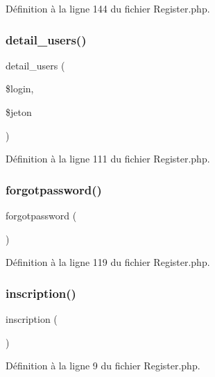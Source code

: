Définition à la ligne 144 du fichier Register.\+php.

\mbox{\label{class_register_a312b3f7f729d750399310ae8c7b8c7de}} 
\subsubsection{\texorpdfstring{detail\+\_\+users()}{detail\_users()}}
{\footnotesize\ttfamily detail\+\_\+users (\begin{DoxyParamCaption}\item[{}]{\$login,  }\item[{}]{\$jeton }\end{DoxyParamCaption})}



Définition à la ligne 111 du fichier Register.\+php.

\mbox{\label{class_register_a29c35afa0b38a581afe73649e5ab755f}} 
\subsubsection{\texorpdfstring{forgotpassword()}{forgotpassword()}}
{\footnotesize\ttfamily forgotpassword (\begin{DoxyParamCaption}{ }\end{DoxyParamCaption})}



Définition à la ligne 119 du fichier Register.\+php.

\mbox{\label{class_register_a4557a98375bdb947deb544e20403b81a}} 
\subsubsection{\texorpdfstring{inscription()}{inscription()}}
{\footnotesize\ttfamily inscription (\begin{DoxyParamCaption}{ }\end{DoxyParamCaption})}



Définition à la ligne 9 du fichier Register.\+php.

